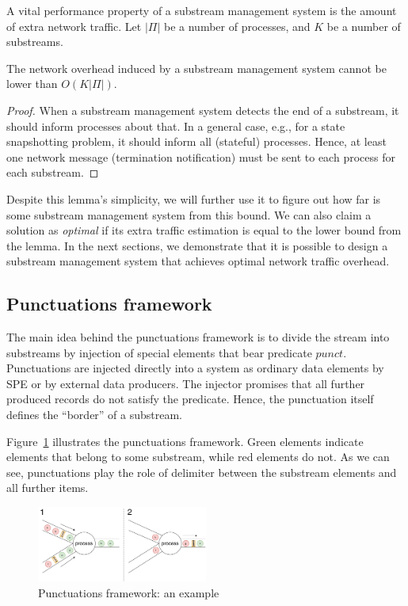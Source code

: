A vital performance property of a substream management system is the amount of extra network traffic. Let $|\Pi|$ be a number of processes, and $K$ be a number of substreams. 

\begin{lemma}
The network overhead induced by a substream management system cannot be lower than $O(K|\Pi|)$. 
\end{lemma}
\begin{proof}
When a substream management system detects the end of a substream, it should inform processes about that. In a general case, e.g., for a state snapshotting problem, it should inform all (stateful) processes. Hence, at least one network message (termination notification) must be sent to each process for each substream.
\end{proof}

Despite this lemma's simplicity, we will further use it to figure out how far is some substream management system from this bound. We can also claim a solution as {\em optimal} if its extra traffic estimation is equal to the lower bound from the lemma. In the next sections, we demonstrate that it is possible to design a substream management system that achieves optimal network traffic overhead.

\subsection{Punctuations framework}
\label{fs-acker-punctuations}

The main idea behind the punctuations framework is to divide the stream into substreams by injection of special elements that bear predicate $punct$. Punctuations are injected directly into a system as ordinary data elements by SPE or by external data producers. The injector promises that all further produced records do not satisfy the predicate. Hence, the punctuation itself defines the ``border'' of a substream.

Figure~\ref{punctuations_scheme} illustrates the punctuations framework. Green elements indicate elements that belong to some substream, while red elements do not. As we can see, punctuations play the role of delimiter between the substream elements and all further items.

\begin{figure}[htbp]
  \centering
  \includegraphics[width=0.50\textwidth]{pics/punctuations-scheme.pdf}
  \caption{Punctuations framework: an example}
  \label{punctuations_scheme}
\end{figure}

